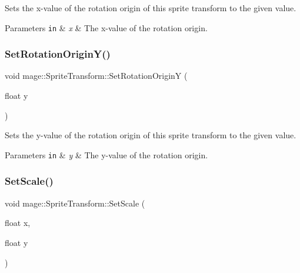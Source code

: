 Sets the x-\/value of the rotation origin of this sprite transform to the given value.


\begin{DoxyParams}[1]{Parameters}
\mbox{\tt in}  & {\em x} & The x-\/value of the rotation origin. \\
\hline
\end{DoxyParams}
\hypertarget{structmage_1_1_sprite_transform_affd054e4f5602930b84a21b1637b657a}{}\label{structmage_1_1_sprite_transform_affd054e4f5602930b84a21b1637b657a} 
\subsubsection{\texorpdfstring{Set\+Rotation\+Origin\+Y()}{SetRotationOriginY()}}
{\footnotesize\ttfamily void mage\+::\+Sprite\+Transform\+::\+Set\+Rotation\+OriginY (\begin{DoxyParamCaption}\item[{float}]{y }\end{DoxyParamCaption})}

Sets the y-\/value of the rotation origin of this sprite transform to the given value.


\begin{DoxyParams}[1]{Parameters}
\mbox{\tt in}  & {\em y} & The y-\/value of the rotation origin. \\
\hline
\end{DoxyParams}
\hypertarget{structmage_1_1_sprite_transform_abc9fdab6e961508423befabd0648dab6}{}\label{structmage_1_1_sprite_transform_abc9fdab6e961508423befabd0648dab6} 
\subsubsection{\texorpdfstring{Set\+Scale()}{SetScale()}\hspace{0.1cm}{\footnotesize\ttfamily [1/2]}}
{\footnotesize\ttfamily void mage\+::\+Sprite\+Transform\+::\+Set\+Scale (\begin{DoxyParamCaption}\item[{float}]{x,  }\item[{float}]{y }\end{DoxyParamCaption})}

